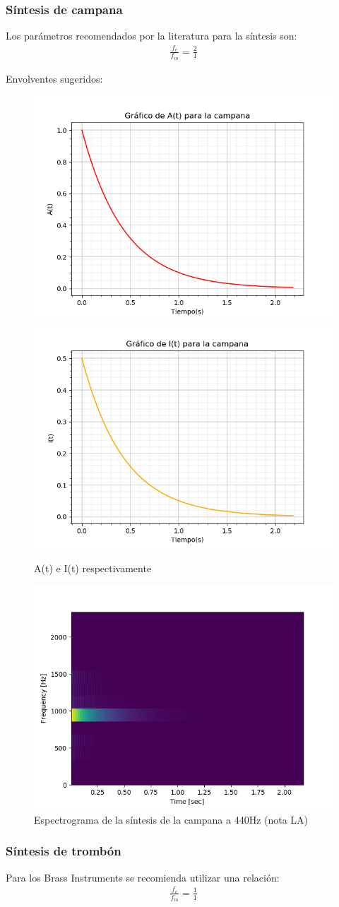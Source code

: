 \documentclass[assd_tp2_main.tex]{subfiles}
\begin{document}
{\newpage

\subsubsection{Síntesis de campana}
Los parámetros recomendados por la literatura para la síntesis son:
\begin{eqnarray*}
\displaystyle \frac{f_c}{f_m}=\frac{2}{1}
\end{eqnarray*}
\par
Envolventes sugeridos:
\begin{figure}[H]
\centering
\includegraphics[width=0.4\linewidth]{graficos/EJ4/at_bell.png}
\includegraphics[width=0.4\linewidth]{graficos/EJ4/it_bell.png}
\caption{A(t) e I(t) respectivamente}
\label{fig:bell_envelopes}
\end{figure}

\begin{figure}[H]
\centering
\includegraphics[width=0.4\linewidth]{graficos/EJ4/BellEspectogram440Hz.png}
\caption{Espectrograma de la síntesis de la campana a 440Hz (nota LA)}
\label{fig:bell_440}
\end{figure}

\newpage

\subsubsection{Síntesis de trombón}
Para los Brass Instruments se recomienda utilizar una relación:
\begin{eqnarray*}
\displaystyle \frac{f_c}{f_m}=\frac{1}{1}
\end{eqnarray*}

}
\end{document}
